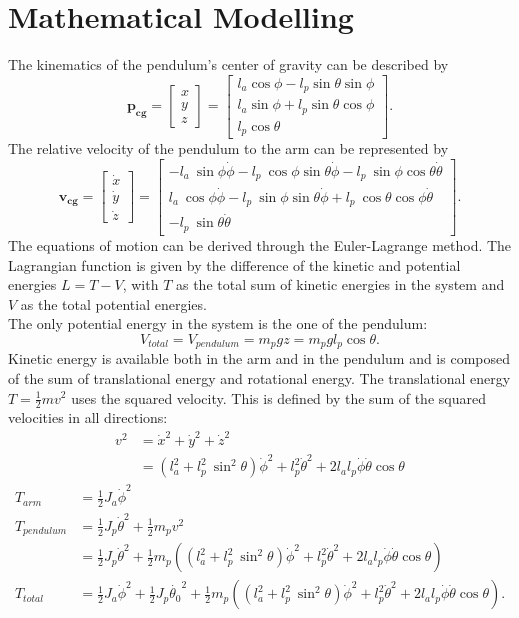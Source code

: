 \section{Mathematical Modelling} 
The kinematics of the pendulum's 
center of gravity can be described by 
\[\mathbf{p_{cg}}=\begin{bmatrix}
x	\\ 
y	\\ 
z	
	\end{bmatrix} =\begin{bmatrix}
l_a\cos\phi-l_{p}\sin\theta\sin\phi \\ 
l_a\sin\phi+l_{p}\sin\theta\cos\phi \\ 
l_{p}\cos\theta
\end{bmatrix}. \] 
The relative velocity of the pendulum to the arm can be represented by 
\[\mathbf{v_{cg}}= \begin{bmatrix}
\dot{x}\\
\dot{y}\\
\dot{z}\end{bmatrix}=\begin{bmatrix}
-l_a\ \sin \phi \dot{\phi}-l_{p}\ \cos\phi \sin\theta\dot{\phi}-l_{p} 
\ \sin\phi \cos\theta\dot{\theta} \\ 
l_a\ \cos\phi\dot{\phi}-l_{p} \ \sin\phi \sin\theta\dot{\phi}+l_{p} 
\ \cos\theta \cos\phi\dot{\theta} \\
-l_{p} \ \sin\theta\dot{\theta}
\end{bmatrix}.\]
The equations of motion can be derived through the Euler-Lagrange 
method. The Lagrangian function is given by the difference of the 
kinetic and potential energies $L=T-V$, with $T$ as the total sum of kinetic 
energies in the system and $V$ as the total potential energies.\\
The only potential energy in the system is the one of the pendulum:
\[V_{total}=V_{pendulum}=m_pgz= m_pgl_{p}\cos\theta.\]
Kinetic energy is available both in the arm and in the pendulum and is composed 
of the sum of translational energy and rotational energy. The translational 
energy \({T=\frac{1}{2}mv^2}\) uses the squared velocity. This is defined by 
the 
sum of the squared velocities in all directions:
\begin{align*}v^2&=\dot{x}^2+\dot{y}^2+\dot{z}^2\\
&=(l_a^2+l_p^2\ 
\sin^2\theta)\dot{\phi}^2+l_p^2\dot{\theta}^2+2l_al_p\dot{\phi}\dot{\theta}\cos 
\theta\end{align*} 
\begin{align*}
T_{arm}&=\frac{1}{2}J_a\dot{\phi}^2\\
T_{pendulum}&=\frac{1}{2}J_p\dot{\theta}^2+\frac{1}{2}m_pv^2\\
&= \frac{1}{2}J_p\dot{\theta}^2+\frac{1}{2}m_p\left((l_a^2+l_p^2\ 
\sin^2\theta)\dot{\phi}^2+l_p^2\dot{\theta}^2+2l_al_p\dot{\phi}\dot{\theta}\cos 
\theta\right)\\
T_{total}&= 
\frac{1}{2}J_a\dot{\phi}^2+\frac{1}{2}J_p\dot{\theta_0}^2+\frac{1}{2}m_p\left((l_a^2+l_p^2\
\sin^2\theta)\dot{\phi}^2+l_p^2\dot{\theta}^2+2l_al_p\dot{\phi}\dot{\theta}\cos 
\theta\right).
\end{align*}
